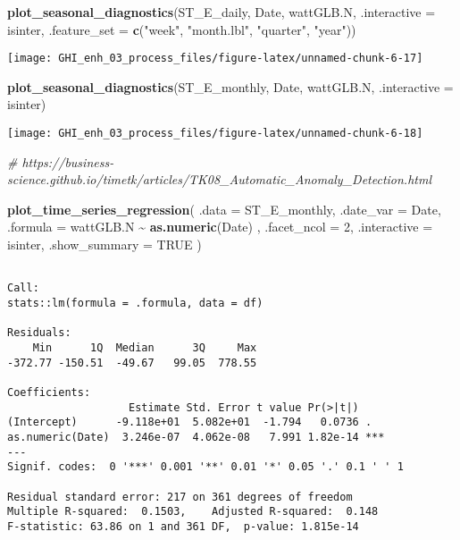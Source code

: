 \documentclass[
  10pt,
  a4paper,oneside]{article}
\newenvironment{Shaded}{\begin{snugshade}}{\end{snugshade}}
\newcommand{\AttributeTok}[1]{\textcolor[rgb]{0.13,0.29,0.53}{#1}}
\newcommand{\CommentTok}[1]{\textcolor[rgb]{0.56,0.35,0.01}{\textit{#1}}}
\newcommand{\ConstantTok}[1]{\textcolor[rgb]{0.56,0.35,0.01}{#1}}
\newcommand{\DecValTok}[1]{\textcolor[rgb]{0.00,0.00,0.81}{#1}}
\newcommand{\FunctionTok}[1]{\textcolor[rgb]{0.13,0.29,0.53}{\textbf{#1}}}
\newcommand{\NormalTok}[1]{#1}
\newcommand{\SpecialCharTok}[1]{\textcolor[rgb]{0.81,0.36,0.00}{\textbf{#1}}}
\newcommand{\StringTok}[1]{\textcolor[rgb]{0.31,0.60,0.02}{#1}}
\begin{document}
\begin{Shaded}
\begin{Highlighting}[]
\FunctionTok{plot\_seasonal\_diagnostics}\NormalTok{(ST\_E\_daily, Date, wattGLB.N, }\AttributeTok{.interactive =}\NormalTok{ isinter,}
                          \AttributeTok{.feature\_set =} \FunctionTok{c}\NormalTok{(}\StringTok{"week"}\NormalTok{, }\StringTok{"month.lbl"}\NormalTok{, }\StringTok{"quarter"}\NormalTok{, }\StringTok{"year"}\NormalTok{))}
\end{Highlighting}
\end{Shaded}

\begin{center}\texttt{[image: GHI\_enh\_03\_process\_files/figure-latex/unnamed-chunk-6-17]} \end{center}

\begin{Shaded}
\begin{Highlighting}[]
\FunctionTok{plot\_seasonal\_diagnostics}\NormalTok{(ST\_E\_monthly, Date, wattGLB.N, }\AttributeTok{.interactive =}\NormalTok{ isinter)}
\end{Highlighting}
\end{Shaded}

\begin{center}\texttt{[image: GHI\_enh\_03\_process\_files/figure-latex/unnamed-chunk-6-18]} \end{center}

\begin{Shaded}
\begin{Highlighting}[]
\CommentTok{\# https://business{-}science.github.io/timetk/articles/TK08\_Automatic\_Anomaly\_Detection.html}

\FunctionTok{plot\_time\_series\_regression}\NormalTok{(}
    \AttributeTok{.data         =}\NormalTok{ ST\_E\_monthly,}
    \AttributeTok{.date\_var     =}\NormalTok{ Date,}
    \AttributeTok{.formula      =}\NormalTok{ wattGLB.N }\SpecialCharTok{\textasciitilde{}} \FunctionTok{as.numeric}\NormalTok{(Date)  ,}
    \AttributeTok{.facet\_ncol   =} \DecValTok{2}\NormalTok{,}
    \AttributeTok{.interactive  =}\NormalTok{ isinter,}
    \AttributeTok{.show\_summary =} \ConstantTok{TRUE}
\NormalTok{)}
\end{Highlighting}
\end{Shaded}

\begin{verbatim}

Call:
stats::lm(formula = .formula, data = df)

Residuals:
    Min      1Q  Median      3Q     Max 
-372.77 -150.51  -49.67   99.05  778.55 

Coefficients:
                   Estimate Std. Error t value Pr(>|t|)    
(Intercept)      -9.118e+01  5.082e+01  -1.794   0.0736 .  
as.numeric(Date)  3.246e-07  4.062e-08   7.991 1.82e-14 ***
---
Signif. codes:  0 '***' 0.001 '**' 0.01 '*' 0.05 '.' 0.1 ' ' 1

Residual standard error: 217 on 361 degrees of freedom
Multiple R-squared:  0.1503,    Adjusted R-squared:  0.148 
F-statistic: 63.86 on 1 and 361 DF,  p-value: 1.815e-14
\end{verbatim}
\end{document}
